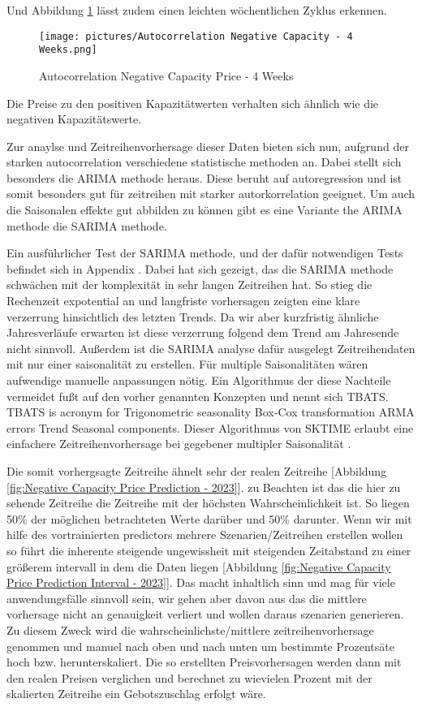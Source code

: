 Und Abbildung \ref{fig:AutocorrNegCap4Weeks} lässt zudem einen leichten wöchentlichen Zyklus erkennen.
\begin{figure}[!h]
	\texttt{[image: pictures/Autocorrelation Negative Capacity - 4 Weeks.png]}
	\caption{Autocorrelation Negative Capacity Price - 4 Weeks}
	\label{fig:AutocorrNegCap4Weeks}
\end{figure}

Die Preise zu den positiven Kapazitätwerten verhalten sich ähnlich wie die negativen Kapazitätswerte.

Zur anaylse und Zeitreihenvorhersage dieser Daten bieten sich nun, aufgrund der starken autocorrelation verschiedene statistische methoden an.
Dabei stellt sich besonders die ARIMA methode heraus. Diese beruht auf autoregression und ist somit besonders gut für zeitreihen mit starker
autorkorrelation geeignet. Um auch die Saisonalen effekte gut abbilden zu können gibt es eine Variante the ARIMA methode die SARIMA methode.

Ein ausführlicher Test der SARIMA methode, und der dafür notwendigen Tests befindet sich in Appendix . Dabei hat sich gezeigt, das die SARIMA methode schwächen mit der
komplexität in sehr langen Zeitreihen hat. So stieg die Rechenzeit expotential an und langfriste vorhersagen zeigten eine klare verzerrung hinsichtlich des letzten Trends.
Da wir aber kurzfristig ähnliche Jahresverläufe erwarten ist diese verzerrung folgend dem Trend am Jahresende nicht sinnvoll.
Außerdem ist die SARIMA analyse dafür ausgelegt Zeitreihendaten mit nur einer saisonalität zu erstellen. Für multiple Saisonalitäten wären aufwendige
manuelle anpassungen nötig. Ein Algorithmus der diese Nachteile vermeidet fußt auf den vorher genannten Konzepten und nennt sich TBATS.
TBATS is acronym for Trigonometric seasonality Box-Cox transformation ARMA errors Trend Seasonal components. Dieser Algorithmus von SKTIME erlaubt eine
einfachere Zeitreihenvorhersage bei gegebener multipler Saisonalität \cite{.05.04.2025}. 

Die somit vorhergsagte Zeitreihe ähnelt sehr der realen Zeitreihe [Abbildung \ref{fig:Negative Capacity Price Prediction - 2023}]. zu Beachten ist das die hier zu sehende Zeitreihe die Zeitreihe mit der höchsten Wahrscheinlichkeit ist.
So liegen 50\% der möglichen betrachteten Werte darüber und 50\% darunter. Wenn wir mit hilfe des vortrainierten predictors mehrere Szenarien/Zeitreihen
erstellen wollen so führt die inherente steigende ungewissheit mit steigenden Zeitabstand zu einer größerem intervall in dem die Daten liegen [Abbildung \ref{fig:Negative Capacity Price Prediction Interval - 2023}].
Das macht inhaltlich sinn und mag für viele anwendungsfälle sinnvoll sein, wir gehen aber davon aus das die mittlere vorhersage nicht an genauigkeit verliert
und wollen daraus szenarien generieren. Zu diesem Zweck wird die wahrscheinlichste/mittlere zeitreihenvorhersage genommen und manuel nach oben und nach unten
um bestimmte Prozentsäte hoch bzw. herunterskaliert. Die so erstellten Preisvorhersagen werden dann mit den realen Preisen verglichen und berechnet zu wievielen
Prozent mit der skalierten Zeitreihe ein Gebotszuschlag erfolgt wäre.

